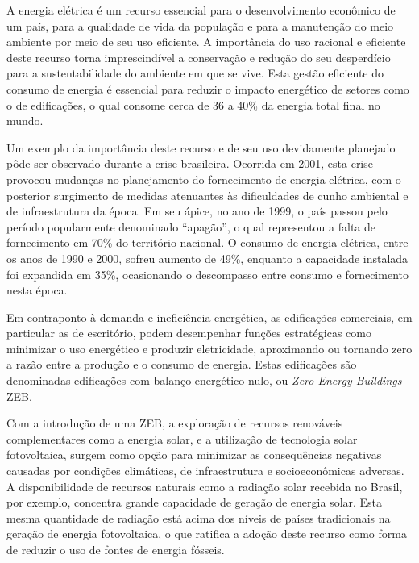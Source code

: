 \begin{onehalfspace}
\footnotesize
    \noindent A energia elétrica é um recurso essencial para o desenvolvimento econômico de 
    um país, para a qualidade de vida da população e para a manutenção do meio ambiente
    por meio de seu uso eficiente. A importância do uso racional e eficiente deste
    recurso torna imprescindível a conservação e redução do seu desperdício para a 
    sustentabilidade do ambiente em que se vive. Esta gestão eficiente do consumo de energia
    é essencial para reduzir o impacto energético de setores como o de edificações, 
    o qual consome cerca de 36 a 40\% da energia total final no mundo.\vspace*{0.3cm}
    
    \noindent Um exemplo da importância deste recurso e de seu uso devidamente planejado 
    pôde ser observado durante a crise brasileira. Ocorrida em 2001, esta crise provocou 
    mudanças no planejamento do fornecimento de energia elétrica, com o posterior 
    surgimento de medidas atenuantes às dificuldades de cunho ambiental e de 
    infraestrutura da época. Em seu ápice, no ano de 1999, o país passou pelo período 
    popularmente denominado “apagão”, o qual representou a falta de fornecimento 
    em 70\% do território nacional. O consumo de energia elétrica, entre os anos 
    de 1990 e 2000, sofreu aumento de 49\%, enquanto a capacidade instalada foi 
    expandida em 35\%, ocasionando o descompasso entre consumo e fornecimento 
    nesta época.\vspace*{0.3cm}

    \noindent Em contraponto à demanda e ineficiência energética, as edificações
    comerciais, em particular as de escritório, podem desempenhar funções estratégicas 
    como minimizar o uso energético e produzir eletricidade, aproximando ou tornando 
    zero a razão entre a produção e o consumo de energia. Estas edificações são 
    denominadas edificações com balanço energético nulo, 
    ou \textit{Zero Energy Buildings} – ZEB.\vspace*{0.3cm}

    \noindent Com a introdução de uma ZEB, a exploração de recursos renováveis complementares 
    como a energia solar, e a utilização de tecnologia solar fotovoltaica, surgem como 
    opção para minimizar as consequências negativas causadas por condições climáticas, 
    de infraestrutura e socioeconômicas adversas. A disponibilidade de recursos naturais 
    como a radiação solar recebida no Brasil, por exemplo, concentra grande capacidade de 
    geração de energia solar. Esta mesma quantidade de radiação está acima dos níveis de 
    países tradicionais na geração de energia fotovoltaica, o que ratifica a adoção deste 
    recurso como forma de reduzir o uso de fontes de energia fósseis.\vspace*{0.3cm}


\end{onehalfspace}

